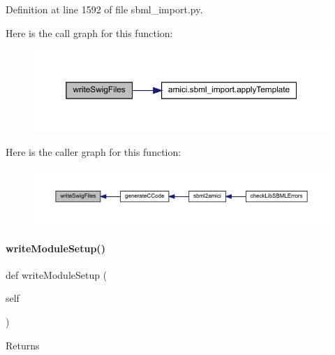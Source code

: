 Definition at line 1592 of file sbml\+\_\+import.\+py.

Here is the call graph for this function\+:
\nopagebreak
\begin{figure}[H]
\begin{center}
\leavevmode
\includegraphics[width=350pt]{classamici_1_1sbml__import_1_1_sbml_importer_a3d8fd08075f483671515fcfae70e1c29_cgraph}
\end{center}
\end{figure}
Here is the caller graph for this function\+:
\nopagebreak
\begin{figure}[H]
\begin{center}
\leavevmode
\includegraphics[width=350pt]{classamici_1_1sbml__import_1_1_sbml_importer_a3d8fd08075f483671515fcfae70e1c29_icgraph}
\end{center}
\end{figure}
\mbox{\label{classamici_1_1sbml__import_1_1_sbml_importer_a6398e5d904f66bf528047fdc48d50ae7}} 
\paragraph{\texorpdfstring{write\+Module\+Setup()}{writeModuleSetup()}}
{\footnotesize\ttfamily def write\+Module\+Setup (\begin{DoxyParamCaption}\item[{}]{self }\end{DoxyParamCaption})}

\begin{DoxyReturn}{Returns}

\end{DoxyReturn}


